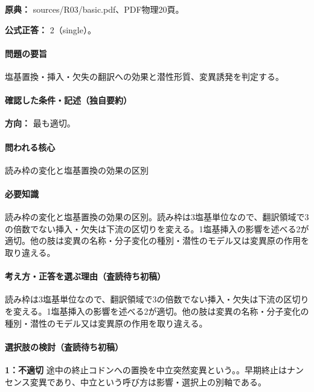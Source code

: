 \noindent\textbf{原典：} sources/R03/basic.pdf、PDF物理20頁。

\textbf{公式正答：} 2（single）。

\paragraph{問題の要旨} 塩基置換・挿入・欠失の翻訳への効果と潜性形質、変異誘発を判定する。

\paragraph{確認した条件・記述（独自要約）}\mbox{}\par

\noindent\textbf{方向：} 最も適切。\par

\paragraph{問われる核心} 読み枠の変化と塩基置換の効果の区別

\paragraph{必要知識} 読み枠の変化と塩基置換の効果の区別。読み枠は3塩基単位なので、翻訳領域で3の倍数でない挿入・欠失は下流の区切りを変える。1塩基挿入の影響を述べる2が適切。他の肢は変異の名称・分子変化の種別・潜性のモデル又は変異原の作用を取り違える。

\paragraph{考え方・正答を選ぶ理由（査読待ち初稿）} 読み枠は3塩基単位なので、翻訳領域で3の倍数でない挿入・欠失は下流の区切りを変える。1塩基挿入の影響を述べる2が適切。他の肢は変異の名称・分子変化の種別・潜性のモデル又は変異原の作用を取り違える。

\paragraph{選択肢の検討（査読待ち初稿）}\mbox{}\par

\noindent\textbf{1：不適切} 途中の終止コドンへの置換を中立突然変異という。。早期終止はナンセンス変異であり、中立という呼び方は影響・選択上の別軸である。\par

